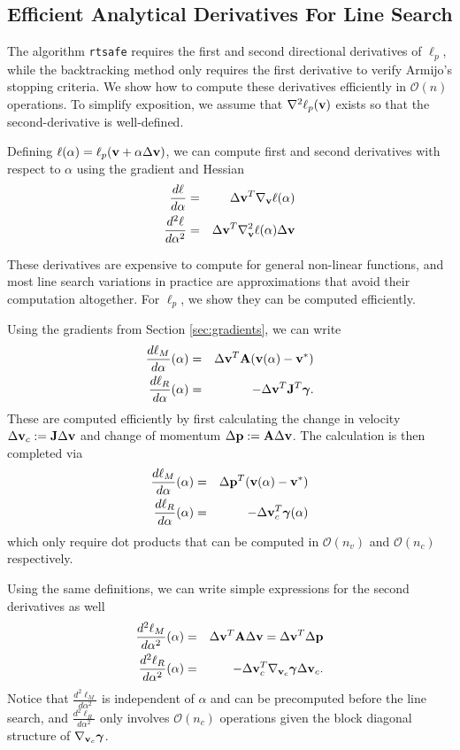 \subsection{Efficient Analytical Derivatives For Line Search}

The algorithm \verb;rtsafe; requires the first and second directional
derivatives of $\ell_p$, while the
backtracking method only requires the first derivative to verify Armijo's
stopping criteria. We show how to compute these derivatives efficiently in
$\mathcal{O}(n)$ operations. To simplify exposition, we assume
that $\nabla^2 \ell_p({\mathbf{v}})$ exists so that the second-derivative is well-defined.

Defining $\ell(\alpha) = \ell_p({\mathbf{v}}+\alpha\Delta{\mathbf{v}})$, we can compute first
and second derivatives with respect to $\alpha$ using the gradient and Hessian
\begin{eqnarray}
	\frac{d\ell}{d\alpha}&=&\Delta{\mathbf{v}}^T\nabla_{\mathbf{v}}\ell(\alpha)\nonumber\\
	\frac{d^2\ell}{d\alpha^2}&=&\Delta{\mathbf{v}}^T\nabla_{\mathbf{v}}^2\ell(\alpha)\Delta{\mathbf{v}}\nonumber
\end{eqnarray}

These derivatives are expensive to compute for general non-linear functions, and
most line search variations in practice are approximations that avoid their
computation altogether. For $\ell_p$, we  show they can be
computed efficiently.

Using the gradients from Section \ref{sec:gradients}, we can write
\begin{eqnarray}
	\frac{d\ell_M}{d\alpha}(\alpha)&=&\Delta{\mathbf{v}}^T{\mathbf{A}}({\mathbf{v}}(\alpha)-{\mathbf{v}}^*)\\
	\frac{d\ell_R}{d\alpha}(\alpha)&=&-\Delta{\mathbf{v}}^T{\mathbf{J}}^T{\bm\gamma}.
\end{eqnarray}
These are computed efficiently by first calculating the change in velocity
$\Delta{\mathbf{v}}_c:={\mathbf{J}}\Delta{\mathbf{v}}$ and change of momentum $\Delta{\mathbf{p}} :=
{\mathbf{A}}\Delta{\mathbf{v}}$. The calculation is then completed via 
\begin{eqnarray}
	\frac{d\ell_M}{d\alpha}(\alpha)&=&\Delta{\mathbf{p}}^T({\mathbf{v}}(\alpha)-{\mathbf{v}}^*)\\
	\frac{d\ell_R}{d\alpha}(\alpha)&=&-\Delta{\mathbf{v}}_c^T{\bm\gamma}(\alpha)
\end{eqnarray}
which only require dot products that can be computed in $\mathcal{O}(n_v)$ and
$\mathcal{O}(n_c)$ respectively.

Using the same definitions, we can write simple expressions for the second
derivatives as well
\begin{eqnarray}
	\frac{d^2\ell_M}{d\alpha^2}(\alpha)&=&\Delta{\mathbf{v}}^T{\mathbf{A}}\Delta{\mathbf{v}}=\Delta{\mathbf{v}}^T\Delta{\mathbf{p}}\\
	\frac{d^2\ell_R}{d\alpha^2}(\alpha)&=&-\Delta{\mathbf{v}}_c^T
	\nabla_{{\mathbf{v}}_c}{\bm\gamma}\Delta{\mathbf{v}}_c.
\end{eqnarray}
Notice that $\frac{d^2\ell_M}{d\alpha^2}$ is independent of $\alpha$ and
can be precomputed before the line search, and
$\frac{d^2\ell_R}{d\alpha^2}$ only involves $\mathcal{O}(n_c)$ operations given
the block diagonal structure of $\nabla_{{\mathbf{v}}_c}{\bm\gamma}$.


